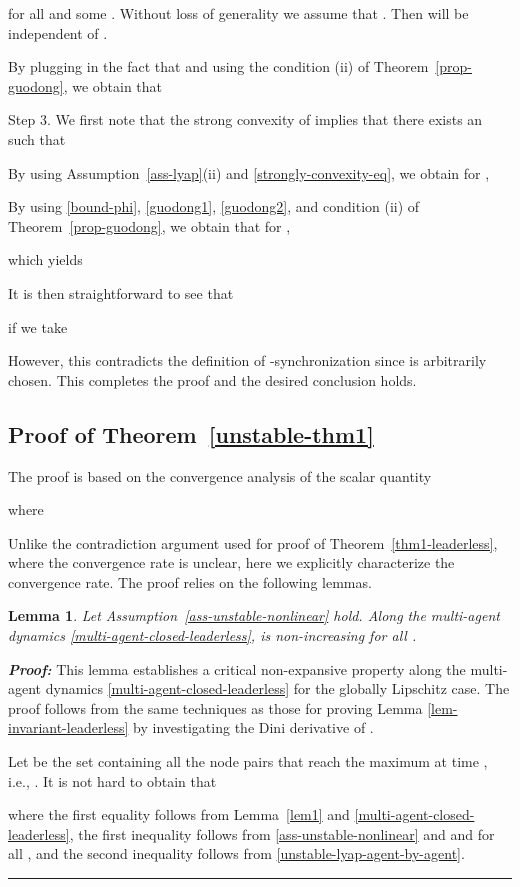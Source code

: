 \documentclass[a4paper, 11pt]{article}
\newtheorem{lemma}{Lemma}
\newenvironment{IEEEproof}[1][\bf Proof]{\smallskip\par\noindent\textit{#1: }}{\hspace*{\fill} \rule{6pt}{6pt}\smallskip}
\begin{document}
for all  and some .
Without loss of generality we assume that . Then  will be independent of .

By plugging in the fact that  and using the condition (ii) of Theorem~\ref{prop-guodong}, we obtain that


\vspace{2mm}

\noindent Step 3. We first note that the strong convexity of  implies that \cite[pp.459]{boyd-vandenberghe}
there exists an  such that

By using Assumption~\ref{ass-lyap}(ii) and \eqref{strongly-convexity-eq}, we obtain for ,

By using \eqref{bound-phi}, \eqref{guodong1}, \eqref{guodong2}, and condition (ii) of Theorem~\ref{prop-guodong},
we obtain that for ,

which yields

It is then straightforward to see that

if we take

However, this contradicts  the definition of -synchronization since  is arbitrarily chosen. This completes the proof and the desired conclusion holds.



\subsection{Proof of Theorem~\ref{unstable-thm1}}\label{proof-unstable-thm1}
The proof is based on the convergence analysis of the scalar quantity

where

Unlike the contradiction argument used for proof of Theorem~\ref{thm1-leaderless}, where the convergence rate is unclear, here we explicitly characterize
the convergence rate. The proof relies on the following lemmas.

\begin{lemma}\label{lemma-invariant-unstable}
Let Assumption~\ref{ass-unstable-nonlinear} hold.
Along the multi-agent dynamics \eqref{multi-agent-closed-leaderless},  is non-increasing for all .
\end{lemma}

\begin{IEEEproof}
This lemma establishes a critical non-expansive property along the multi-agent dynamics \eqref{multi-agent-closed-leaderless} for the globally Lipschitz case.
The proof follows from the same techniques as those for proving Lemma \ref{lem-invariant-leaderless} by investigating the Dini derivative of . 

Let  be the set containing all the node pairs that reach the maximum at time , i.e.,
.
It is not hard to obtain that

where the first equality follows from Lemma~\ref{lem1} and \eqref{multi-agent-closed-leaderless},
the first inequality follows from  \eqref{ass-unstable-nonlinear} and  and  for all , and the second inequality follows from \eqref{unstable-lyap-agent-by-agent}.
\end{IEEEproof}
\end{document}
